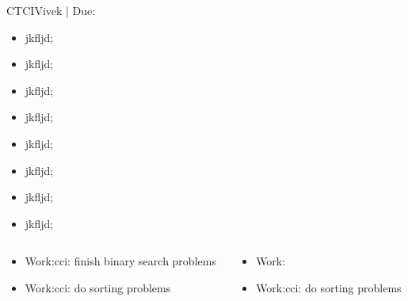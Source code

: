 \begin{frame}{CTCI}{Vivek | Due: }

    \begin{multicols}{4}
    
    
    \begin{itemize}
        \item jkfljd;
         \item jkfljd;
          \item jkfljd;
           \item jkfljd;
            \item jkfljd;
             \item jkfljd;
              \item jkfljd;
               \item jkfljd;
    \end{itemize}
    \end{multicols}
    
    \begin{columns}
    \begin{column}{0.5\textwidth}
    
\begin{itemize}
        \item Work:cci: finish binary search problems 
        \item Work:cci: do sorting problems
    \end{itemize}
    
    \end{column}
    
    \begin{column}{0.5\textwidth}
   
\begin{itemize}
        \item Work: 
        \item Work:cci: do sorting problems
    \end{itemize}

\end{column} 

\end{columns}

\end{frame}